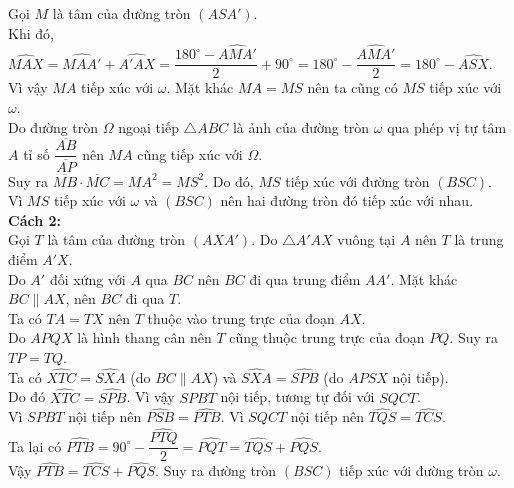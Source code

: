 \begin{ex}
{\begin{center}
	\end{center}
	Gọi $M$ là tâm của đường tròn $(ASA')$.
	\\ Khi đó, $\widehat{MAX}= \widehat{MAA'} + \widehat{A'AX} =\dfrac{180^\circ - \widehat{AMA'}}{2} +90^\circ= 180^\circ - \dfrac{\widehat{AMA'}}{2}= 180^\circ - \widehat{ASX}$. 
	\\ Vì vậy $MA$ tiếp xúc với $\omega$. Mặt khác $MA=MS$ nên ta cũng có $MS$ tiếp xúc với $\omega$.
	\\ Do đường tròn $\Omega$ ngoại tiếp $\triangle ABC$ là ảnh của đường tròn $\omega$ qua phép vị tự tâm $A$ tỉ số $\dfrac{\overline{AB}}{\overline{AP}}$ nên $MA$ cũng tiếp xúc với $\Omega$.
	\\ Suy ra $\overline{MB} \cdot \overline{MC} = MA^2 =MS^2$. Do đó, $MS$ tiếp xúc với đường tròn $(BSC)$.
	\\ Vì $MS$ tiếp xúc với $\omega$ và $(BSC)$ nên hai đường tròn đó tiếp xúc với nhau.
	\\ \textbf{Cách 2:} 
	\\ Gọi $T$ là tâm của đường tròn $(AXA')$. Do $\triangle A'AX$ vuông tại $A$ nên $T$ là trung điểm $A'X$. 
	\\ Do $A'$ đối xứng với $A$ qua $BC$ nên $BC$ đi qua trung điểm $AA'$. Mặt khác $BC \parallel AX$, nên $BC$ đi qua $T$. 
	\\ Ta có $TA= TX$ nên $T$ thuộc vào trung trực của đoạn $AX$. 
	\\ Do $APQX$ là hình thang cân nên $T$ cũng thuộc trung trực của  đoạn $PQ$. Suy ra $TP=TQ$.
	\\ Ta có $\widehat{XTC} = \widehat{SXA}$ (do $BC \parallel AX$) và $\widehat{SXA} = \widehat{SPB}$ (do $APSX$ nội tiếp).
	\\ Do đó $\widehat{XTC} = \widehat{SPB}$. Vì vậy $SPBT$ nội tiếp, tương tự đối với $SQCT$.
	\\ Vì $SPBT$ nội tiếp nên $\widehat{PSB} = \widehat{PTB}$. Vì $SQCT$ nội tiếp nên $\widehat{TQS} = \widehat{TCS}$.
	\\ Ta lại có $\widehat{PTB} = 90^\circ - \dfrac{\widehat{PTQ}}{2} = \widehat{PQT}= \widehat{TQS} + \widehat{PQS}.$
	\\ Vậy $\widehat{PTB} =\widehat{TCS} + \widehat{PQS}$. Suy ra đường tròn $(BSC)$ tiếp xúc với đường tròn $\omega$.
}
\end{ex}
	
